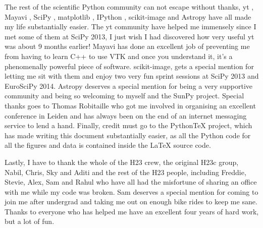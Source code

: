 \begin{acknowledgements}
The rest of the scientific Python community can not escape without thanks, yt \citep{turk2011}, Mayavi \citep{ramachandran2011}, SciPy \citep{jones2001}, matplotlib \citep{hunter2007}, IPython \citep{perez2007}, scikit-image \citep{vanderwalt2014} and Astropy \citep{theastropycollaboration2013} have all made my life substantially easier.
The yt community have helped me immensely since I met some of them at SciPy 2013, I just wish I had discovered how very useful yt was about 9 months earlier!
Mayavi has done an excellent job of preventing me from having to learn C++ to use VTK and once you understand it, it's a phenomenally powerful piece of software.
scikit-image, gets a special mention for letting me sit with them and enjoy two very fun sprint sessions at SciPy 2013 and EuroSciPy 2014.
Astropy deserves a special mention for being a very supportive community and being so welcoming to myself and the SunPy project. Special thanks goes to Thomas Robitaille who got me involved in organising an excellent conference in Leiden and has always been on the end of an internet messaging service to lend a hand.
Finally, credit must go to the PythonTeX \citep{poore2015} project, which has made writing this document substantially easier, as all the Python code for all the figures and data is contained inside the LaTeX source code.

Lastly, I have to thank the whole of the H23 crew, the original H23c group, Nabil, Chris, Sky and Aditi and the rest of the H23 people, including Freddie, Stevie, Alex, Sam and Rahul who have all had the misfortune of sharing an office with me while my code was broken.
Sam deserves a special mention for coming to join me after undergrad and taking me out on enough bike rides to keep me sane.
Thanks to everyone who has helped me have an excellent four years of hard work, but a lot of fun.

\end{acknowledgements}
